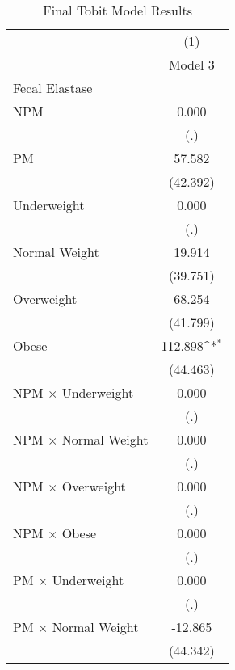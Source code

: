 \begin{table}[htbp]\centering
\def\sym#1{\ifmmode^{#1}\else\(^{#1}\)\fi}
\caption{Final Tobit Model Results}
\begin{tabular}{l*{1}{c}}
\hline\hline
                    &\multicolumn{1}{c}{(1)}\\
                    &\multicolumn{1}{c}{Model 3}\\
\hline
Fecal Elastase      &                     \\
NPM                 &       0.000         \\
                    &         (.)         \\
[1em]
PM                  &      57.582         \\
                    &    (42.392)         \\
[1em]
Underweight         &       0.000         \\
                    &         (.)         \\
[1em]
Normal Weight       &      19.914         \\
                    &    (39.751)         \\
[1em]
Overweight          &      68.254         \\
                    &    (41.799)         \\
[1em]
Obese               &     112.898\sym{*}  \\
                    &    (44.463)         \\
[1em]
NPM $\times$ Underweight&       0.000         \\
                    &         (.)         \\
[1em]
NPM $\times$ Normal Weight&       0.000         \\
                    &         (.)         \\
[1em]
NPM $\times$ Overweight&       0.000         \\
                    &         (.)         \\
[1em]
NPM $\times$ Obese  &       0.000         \\
                    &         (.)         \\
[1em]
PM $\times$ Underweight&       0.000         \\
                    &         (.)         \\
[1em]
PM $\times$ Normal Weight&     -12.865         \\
                    &    (44.342)         \\

\end{tabular}
\end{table}
